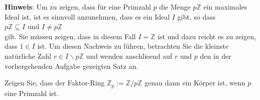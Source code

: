 \noindent
\textbf{Hinweis}: Um zu zeigen, dass f\"{u}r eine Primzahl $p$ die Menge $p\mathbb{Z}$ ein maximales
Ideal ist, ist es sinnvoll anzunehmen, dass es ein Ideal $I$
gibt, so dass
\\[0.2cm]
\hspace*{1.3cm}
$p\mathbb{Z} \subseteq I$ \quad und \quad $I \not= p\mathbb{Z}$
\\[0.2cm]
gilt.  Sie m\"{u}ssen zeigen, dass in diesem Fall $I = \mathbb{Z}$ ist und dazu reicht es zu zeigen,
dass $1 \in I$ ist.  Um diesen Nachweis zu f\"{u}hren, betrachten Sie die
kleinste nat\"{u}rliche Zahl $r \in I \backslash p\mathbb{Z}$ und wenden anschlie\3end auf $r$ und $p$
den in der vorhergehenden Aufgabe gezeigten Satz an. \exend 

\exercise
Zeigen Sie, dass der Faktor-Ring $\mathbb{Z}_p := \mathbb{Z}/p\mathbb{Z}$ genau dann ein K\"{o}rper ist,
wenn $p$ eine Primzahl ist.
\eoxs

